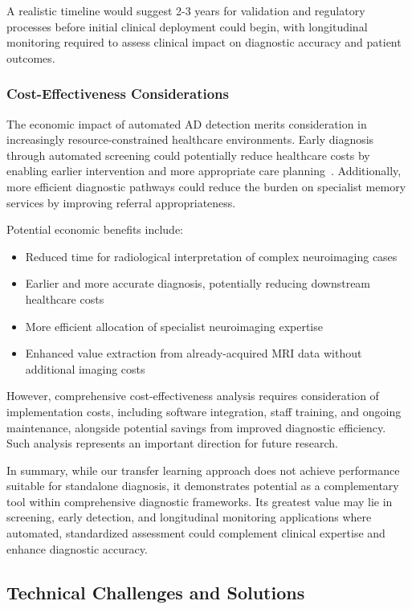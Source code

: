 \documentclass[12pt, a4paper]{article}
\begin{document}
A realistic timeline would suggest 2-3 years for validation and regulatory processes before initial clinical deployment could begin, with longitudinal monitoring required to assess clinical impact on diagnostic accuracy and patient outcomes.

\subsubsection{Cost-Effectiveness Considerations}

The economic impact of automated AD detection merits consideration in increasingly resource-constrained healthcare environments. Early diagnosis through automated screening could potentially reduce healthcare costs by enabling earlier intervention and more appropriate care planning~\cite{jack2018nia}. Additionally, more efficient diagnostic pathways could reduce the burden on specialist memory services by improving referral appropriateness.

Potential economic benefits include:
\begin{itemize}
    \item Reduced time for radiological interpretation of complex neuroimaging cases
    \item Earlier and more accurate diagnosis, potentially reducing downstream healthcare costs
    \item More efficient allocation of specialist neuroimaging expertise
    \item Enhanced value extraction from already-acquired MRI data without additional imaging costs
\end{itemize}

However, comprehensive cost-effectiveness analysis requires consideration of implementation costs, including software integration, staff training, and ongoing maintenance, alongside potential savings from improved diagnostic efficiency. Such analysis represents an important direction for future research.

In summary, while our transfer learning approach does not achieve performance suitable for standalone diagnosis, it demonstrates potential as a complementary tool within comprehensive diagnostic frameworks. Its greatest value may lie in screening, early detection, and longitudinal monitoring applications where automated, standardized assessment could complement clinical expertise and enhance diagnostic accuracy.

\subsection{Technical Challenges and Solutions}
\end{document}
